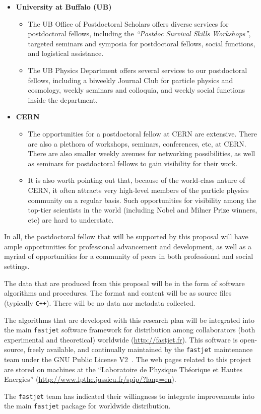 \documentclass[times,11pt]{article}
\begin{document}
\begin{itemize}
\item {\bf University at Buffalo (UB)}
\begin{itemize}
\item The UB Office of Postdoctoral Scholars offers diverse services
  for postdoctoral fellows, including the {\sl ``Postdoc Survival
    Skills Workshops''}, targeted seminars and symposia for
  postdoctoral fellows, social functions, and logistical assistance. 
\item The UB Physics Department offers several services to our
  postdoctoral fellows, including a biweekly Journal Club for particle
  physics and cosmology, weekly seminars and colloquia, and weekly
  social functions inside the department. 
\end{itemize}
\item {\bf CERN}
\begin{itemize}
\item The opportunities for a postdoctoral fellow at CERN
  are extensive. There are also a plethora of workshops,
  seminars, conferences, etc, at CERN. There are also smaller weekly
  avenues for networking possibilities, as well as seminars for
  postdoctoral fellows to gain visibility for their work. 
\item It is also worth pointing out that, because of the world-class
  nature of CERN, it often attracts very high-level members of the
  particle physics community on a regular basis. Such opportunities
  for visibility among the top-tier scientists in the world (including
  Nobel and Milner Prize winners, etc) are hard to understate. 
\end{itemize}
\end{itemize}

In all, the postdoctoral fellow that will be supported by this
proposal will have ample opportunities for professional advancement
and development, as well as a myriad of opportunities for a community
of peers in both professional and social settings. 



\newpage
{}
\renewcommand{\thepage} {E--\arabic{page}}



The data that are produced from this proposal will be in the form of
software algorithms and procedures. The format and content will be as
source files (typically {\tt C++}). There will be no data nor metadata
collected. 

The algorithms that are developed with this research plan will be
integrated into the main {\tt fastjet} software framework for
distribution among collaborators (both experimental and theoretical)
worldwide (\url{http://fastjet.fr}). This software is open-source,
freely available, and continually maintained by the {\tt fastjet}
maintenance team under the GNU Public License V2~\cite{gnupl}. 
The web pages related to this project are stored on
machines at the ``Laboratoire de Physique Théorique et Hautes Energies'' 
(\url{http://www.lpthe.jussieu.fr/spip/?lang=en}). 

The {\tt fastjet} team has indicated their willingness to integrate
improvements into the main {\tt fastjet} package for worldwide
distribution. 
\end{document}

